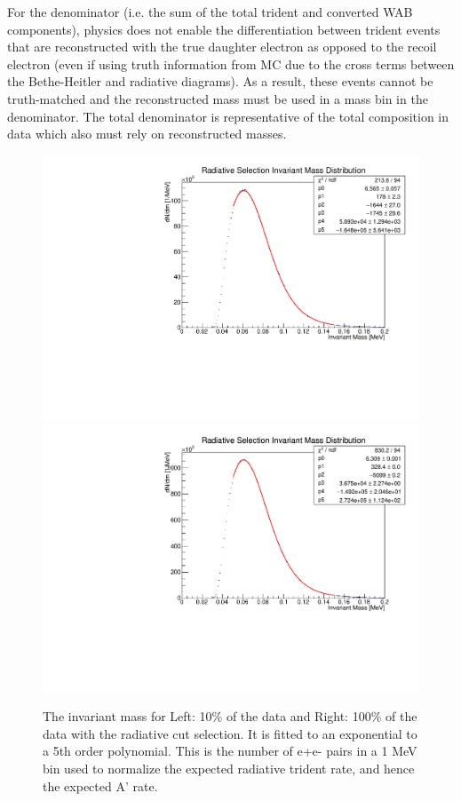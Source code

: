 For the denominator (i.e. the sum of the total trident and converted WAB components), physics does not enable the differentiation between trident events that are reconstructed with the true daughter electron as opposed to the recoil electron (even if using truth information from MC due to the cross terms between the Bethe-Heitler and radiative diagrams). As a result, these events cannot be truth-matched and the reconstructed mass must be used in a mass bin in the denominator. The total denominator is representative of the total composition in data which also must rely on reconstructed masses.


\begin{figure}[t]
    \centering
    \includegraphics[width=.45\textwidth]{figs/recon/invmass.pdf}
    \includegraphics[width=.45\textwidth]{figs/recon/radfrac_unblind.pdf}
    \caption{The invariant mass for Left: 10\% of the data and Right: 100\% of the data with the radiative cut selection. It is fitted to an exponential to a 5th order polynomial. This is the number of e+e- pairs in a 1 MeV bin used to normalize the expected radiative trident rate, and hence the expected A' rate.}
    \label{fig:inv_mass}
\end{figure}

